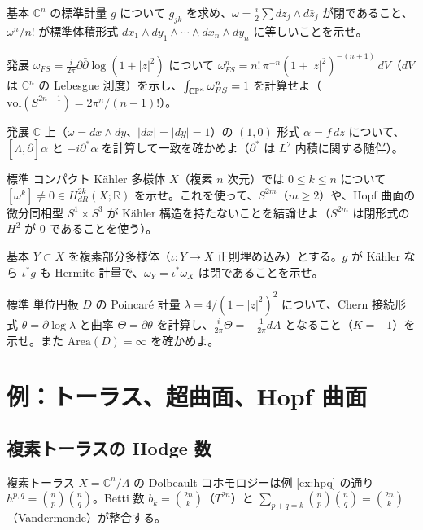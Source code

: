 \begin{prob}{基本}\label{p:kahlercn}
$\mathbb C^n$ の標準計量 $g$ について $g_{j\bar k}$ を求め、$\omega=\frac i2\sum dz_j\wedge d\bar z_j$ が閉であること、$\omega^n/n!$ が標準体積形式 $dx_1\wedge dy_1\wedge\cdots\wedge dx_n\wedge dy_n$ に等しいことを示せ。
\end{prob}
\begin{prob}{発展}\label{p:fsvol}
$\omega_{FS}=\frac i{2\pi}\partial\bar\partial\log(1+|z|^2)$ について $\omega_{FS}^n=n!\,\pi^{-n}(1+|z|^2)^{-(n+1)}\,dV$（$dV$ は $\mathbb C^n$ の Lebesgue 測度）を示し、$\int_{\mathbb{CP}^n}\omega_{FS}^n=1$ を計算せよ（$\mathrm{vol}(S^{2n-1})=2\pi^n/(n-1)!$）。
\end{prob}
\begin{prob}{発展}\label{p:kid1}
$\mathbb C$ 上（$\omega=dx\wedge dy$、$|dx|=|dy|=1$）の $(1,0)$ 形式 $\alpha=f\,dz$ について、$[\Lambda,\bar\partial]\alpha$ と $-i\partial^*\alpha$ を計算して一致を確かめよ（$\partial^*$ は $L^2$ 内積に関する随伴）。
\end{prob}
\begin{prob}{標準}\label{p:cpt2k}
コンパクト Kähler 多様体 $X$（複素 $n$ 次元）では $0\le k\le n$ について $[\omega^k]\ne0\in H^{2k}_{dR}(X;\mathbb R)$ を示せ。これを使って、$S^{2m}$（$m\ge2$）や、Hopf 曲面の微分同相型 $S^1\times S^3$ が Kähler 構造を持たないことを結論せよ（$S^{2m}$ は閉形式の $H^2$ が $0$ であることを使う）。
\end{prob}
\begin{prob}{基本}\label{p:sub}
$Y\subset X$ を複素部分多様体（$\iota:Y\to X$ 正則埋め込み）とする。$g$ が Kähler なら $\iota^*g$ も Hermite 計量で、$\omega_Y=\iota^*\omega_X$ は閉であることを示せ。
\end{prob}

\begin{prob}{標準}\label{p:disc}
単位円板 $D$ の Poincaré 計量 $\lambda=4/(1-|z|^2)^2$ について、Chern 接続形式 $\theta=\partial\log\lambda$ と曲率 $\Theta=\bar\partial\theta$ を計算し、$\frac i{2\pi}\Theta=-\frac1{2\pi}dA$ となること（$K=-1$）を示せ。また $\mathrm{Area}(D)=\infty$ を確かめよ。
\end{prob}


\section{例：トーラス、超曲面、Hopf 曲面}\label{sec:examples}

\subsection{複素トーラスの Hodge 数}
\begin{ex}
複素トーラス $X=\mathbb C^n/\Lambda$ の Dolbeault コホモロジーは例 \ref{ex:hpq} の通り $h^{p,q}=\binom np\binom nq$。Betti 数 $b_k=\binom{2n}k$（$T^{2n}$）と $\sum_{p+q=k}\binom np\binom nq=\binom{2n}k$（Vandermonde）が整合する。
\end{ex}



